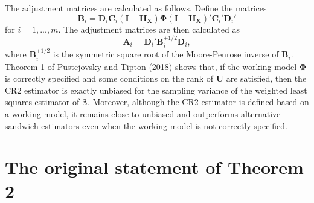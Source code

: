 \documentclass[12pt]{article}
\begin{document}
The adjustment matrices are calculated as follows. Define the matrices
\begin{equation}
\label{eq:B-matrix}
\mathbf{B}_i = \mathbf{D}_i \mathbf{C}_i \left(\mathbf{I} - \mathbf{H}_{\mathbf{X}}\right) \boldsymbol\Phi \left(\mathbf{I} - \mathbf{H}_{\mathbf{X}}\right)'\mathbf{C}_i' \mathbf{D}_i'
\end{equation} for \(i = 1,...,m\). The adjustment matrices are then
calculated as \begin{equation}
\label{eq:A-matrix}
\mathbf{A}_i = \mathbf{D}_i' \mathbf{B}_i^{+1/2} \mathbf{D}_i,
\end{equation} where \(\mathbf{B}_i^{+1/2}\) is the symmetric square
root of the Moore-Penrose inverse of \(\mathbf{B}_i\). Theorem 1 of
Pustejovsky and Tipton (2018) shows that, if the working model
\(\boldsymbol\Phi\) is correctly specified and some conditions on the
rank of \(\mathbf{U}\) are satisfied, then the CR2 estimator is exactly
unbiased for the sampling variance of the weighted least squares
estimator of \(\boldsymbol\beta\). Moreover, although the CR2 estimator
is defined based on a working model, it remains close to unbiased and
outperforms alternative sandwich estimators even when the working model
is not correctly specified.

\hypertarget{original}{%
\section{The original statement of Theorem 2}\label{original}}
\end{document}
